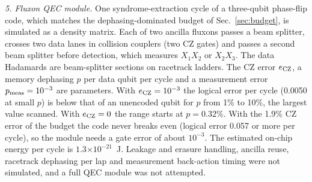 \documentclass[10pt,twocolumn,letterpaper]{article}
\newcommand{\ee}[1]{\ensuremath{\times10^{#1}}}
\begin{document}
\emph{5. Fluxon QEC module.} One syndrome-extraction cycle of a three-qubit phase-flip code, which matches the
dephasing-dominated budget of Sec.~\ref{sec:budget}, is simulated as a density matrix. Each of two ancilla fluxons
passes a beam splitter, crosses two data lanes in collision couplers (two CZ gates) and passes a second beam splitter
before detection, which measures $X_1X_2$ or $X_2X_3$. The data Hadamards are beam-splitter sections on racetrack
ladders. The CZ error $e_{\rm CZ}$, a memory dephasing $p$ per data qubit per cycle and a measurement error
$p_{\rm meas}=10^{-3}$ are parameters. With $e_{\rm CZ}=10^{-3}$ the logical error per cycle (0.0050 at small $p$) is
below that of an unencoded qubit for $p$ from 1\% to 10\%, the largest value scanned. With $e_{\rm CZ}=0$ the range
starts at $p=0.32$\%. With the 1.9\% CZ error of the budget the code never breaks even (logical error 0.057 or more per
cycle), so the module needs a gate error of about $10^{-3}$. The estimated on-chip energy per cycle is
$1.3\ee{-21}$~J. Leakage and erasure handling, ancilla reuse, racetrack dephasing per lap and measurement back-action
timing were not simulated, and a full QEC module was not attempted.
\end{document}
